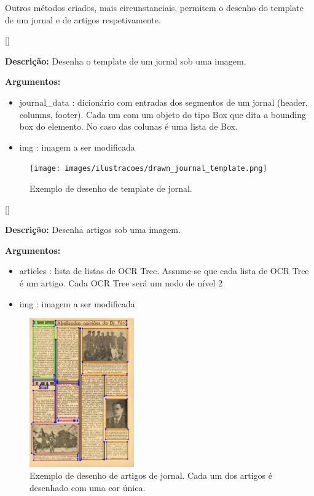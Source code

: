 Outros métodos criados, mais circunstanciais, permitem o desenho do template de um jornal e de artigos respetivamente.

[\normalsize]

\textbf{Descrição:} Desenha o template de um jornal sob uma imagem.

\textbf{Argumentos:}
\begin{itemize}\setlength\itemsep{-0.3em}
	\item journal\_data : dicionário com entradas dos segmentos de um jornal (header, columns, footer). Cada um com um objeto do tipo Box que dita a bounding box do elemento. No caso das colunas é uma lista de Box.
	\item img : imagem a ser modificada
\end{itemize}


\begin{figure}[H]
	\centering
	\texttt{[image: images/ilustracoes/drawn\_journal\_template.png]}
	\caption{Exemplo de desenho de template de jornal.}
	\label{fig:draw_journal_template}
\end{figure}



[\normalsize]

\textbf{Descrição:} Desenha artigos sob uma imagem.

\textbf{Argumentos:}
\begin{itemize}\setlength\itemsep{-0.3em}
	\item articles : lista de listas de OCR Tree. Assume-se que cada lista de OCR Tree é um artigo. Cada OCR Tree será um nodo de nível 2
	\item img : imagem a ser modificada
\end{itemize}

\begin{figure}[H]
	\centering
	\includegraphics[width=0.4\textwidth]{images/ilustracoes/draw_articles.png}
	\caption{Exemplo de desenho de artigos de jornal. Cada um dos artigos é desenhado com uma cor única.}
	\label{fig:draw_articles}
\end{figure}



